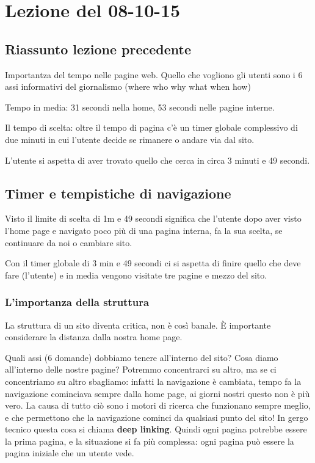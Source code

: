 \section{Lezione del 08-10-15}

\subsection{Riassunto lezione precedente}
Importantza del tempo nelle pagine web. Quello che vogliono gli utenti sono i 6 assi informativi del giornalismo (where who why what when how)

Tempo in media: 31 secondi nella home, 53 secondi nelle pagine interne.

Il tempo di scelta: oltre il tempo di pagina c'\`e un timer globale complessivo di due minuti in cui l'utente decide se rimanere o andare via dal sito.

L'utente si aspetta di aver trovato quello che cerca in circa 3 minuti e 49 secondi.

\subsection{Timer e tempistiche di navigazione}

Visto il limite di scelta di 1m e 49 secondi significa che l'utente dopo aver visto l'home page e navigato poco pi\`u di una pagina interna, fa la sua scelta, se continuare da noi o cambiare sito.

Con il timer globale di 3 min e 49 secondi ci si aspetta di finire quello che deve fare (l'utente) e in media vengono visitate tre pagine e mezzo del sito.

\subsubsection{L'importanza della struttura}

La struttura di un sito diventa critica, non \`e cos\`i banale. \`E importante considerare la distanza dalla nostra home page.

Quali assi (6 domande) dobbiamo tenere all'interno del sito? Cosa diamo all'interno delle nostre pagine? Potremmo concentrarci su altro, ma se ci concentriamo su altro sbagliamo: infatti la navigazione \`e cambiata, tempo fa la navigazione cominciava sempre dalla home page, ai giorni nostri questo non \`e pi\`u vero. La causa di tutto ci\`o sono i motori di ricerca che funzionano sempre meglio, e che permettono che la navigazione cominci da qualsiasi punto del sito! In gergo tecnico questa cosa si chiama \textbf{deep linking}. Quindi ogni pagina potrebbe essere la prima pagina, e la situazione si fa pi\`u complessa: ogni pagina pu\`o essere la pagina iniziale che un utente vede.

